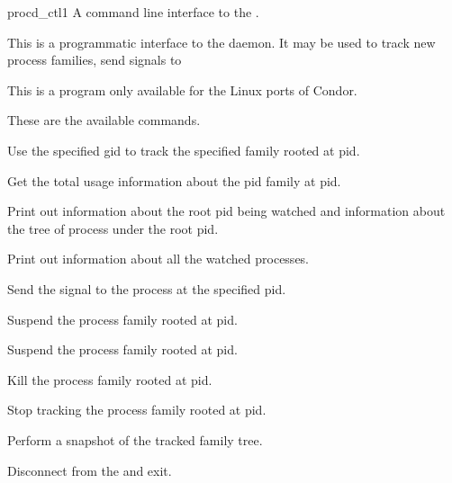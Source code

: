 \begin{ManPage}{\label{man-procd-ctl}procd\_ctl}{1}
{A command line interface to the .}
\Synopsis {}


\Description 

This is a programmatic interface to the  daemon. It may be
used to track new process families, send signals to 

This is a program only available for the Linux ports of Condor.

\begin{Options}

	

	These are the available commands.

		{Use the specified gid to track the specified family rooted at pid.}

		{Get the total usage information about the pid family at pid.}

		{Print out information about the root pid being watched and information
		about the tree of process under the root pid.}

		{Print out information about all the watched processes.}

		{Send the signal to the process at the specified pid.}

		{Suspend the process family rooted at pid.}

		{Suspend the process family rooted at pid.}

		{Kill the process family rooted at pid.}

		{Stop tracking the process family rooted at pid.}

		{Perform a snapshot of the tracked family tree.}

		{Disconnect from the  and exit.}


\end{Options}
\end{ManPage}
